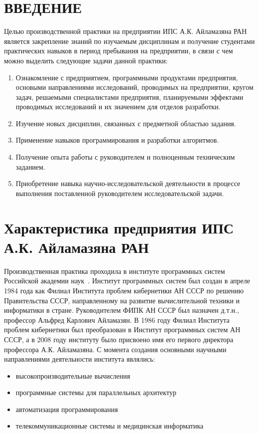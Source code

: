 \documentclass[14pt, russian]{scrartcl}
\newcommand{\anonsection}[1]{\cleardoublepage
\phantomsection
\addcontentsline{toc}{section}{\protect\numberline{}#1}
\section*{#1}\vspace*{2.5ex} %
}
\begin{document}

\setlength{\tabcolsep}{3pt}
\newpage
\setcounter{page}{2}


\newpage
\renewcommand\contentsname{\hfill{\normalfont{СОДЕРЖАНИЕ}}\hfill}  %
\tableofcontents
\newpage

\anonsection{ВВЕДЕНИЕ}  %
Целью производственной практики на предприятии ИПС А.К. Айламазяна РАН является закрепление знаний по изучаемым дисциплинам 
и получение студентами практических навыков в период пребывания на предприятии, 
в связи с чем можно выделить следующие задачи данной практики:

\begin{enumerate}
  \item Ознакомление с предприятием, программными продуктами предприятия, основыми направлениями исследований, проводимых на предприятии, кругом задач, решаемыми специалистами предприятия, планируемыми эффектами проводимых исследований и их значением для отделов разработки.
  \item Изучение новых дисциплин, связанных с предметной областью задания.
  \item Применение навыков программирования и разработки алгоритмов. 
  \item Получение опыта работы с руководителем и полноценным техническим заданием.
  \item Приобретение навыка научно-исследовательской деятельности в процессе выполнения поставленной руководителем исследовательской задачи.
\end{enumerate}

\section{Характеристика предприятия ИПС А.К. Айламазяна РАН}
Производственная практика проходила в институте программных систем Российской академии наук~\cite{IPS}.
Институт программных систем  был создан в апреле 1984 года как Филиал Института проблем кибернетики АН СССР по решению Правительства СССР, направленному на развитие вычислительной техники и информатики в стране. Руководителем ФИПК АН СССР был назначен д.т.н., профессор Альфред Карлович Айламазян. В 1986 году Филиал Института проблем кибернетики был преобразован в Институт программных систем АН СССР, а в 2008 году институту было присвоено имя его первого директора профессора А.К. Айламазяна.
С момента создания основными научными направлениями деятельности  института являлись:
\begin{itemize}
\item высокопроизводительные вычисления
\item программные системы для параллельных архитектур
\item автоматизация программирования
\item телекоммуникационные системы и медицинская информатика
\end{itemize}
\end{document}
